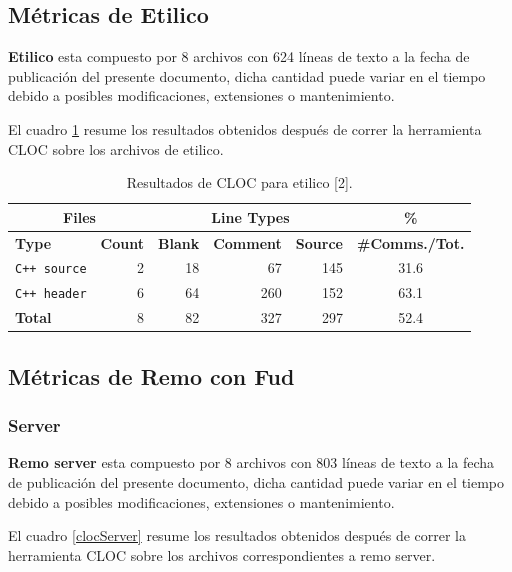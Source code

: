 \subsection{Métricas de Etilico}
\par \textbf{Etilico} esta compuesto por 8 archivos con 624 líneas de texto a la fecha de publicación del presente documento, dicha cantidad puede variar en el tiempo debido a posibles modificaciones, extensiones o mantenimiento.

\par El cuadro \ref{clocEtilico} resume los resultados obtenidos después de correr la herramienta CLOC sobre los archivos de etilico.

\begin{table}[!htf]
    \begin{center}
    \begin{tabular}{|l|r|r|r|r|c|}
    \hline
    \multicolumn{2}{|c|}{Files} & \multicolumn{3}{|c|}{Line Types} & \hspace{0.2cm}\% \\
    \hline
    \textbf{Type} & \textbf{Count} & \textbf{Blank} & \textbf{Comment} & \textbf{Source} & \small{\textbf{\#Comms./Tot.}}\\
    \hline
    \texttt{C++ source} & 2 & 18 & 67 & 145 & 31.6 \\
    \hline
    \texttt{C++ header} & 6 & 64 & 260 & 152 & 63.1 \\
    \hline
    \textbf{Total}      & 8 & 82 & 327 & 297 & 52.4 \\
    \hline
    \end{tabular}
    \caption{Resultados de CLOC para etilico [2].}
    \label{clocEtilico}
    \end{center}
\end{table}

\subsection{Métricas de \textbf{Remo} con Fud}
\subsubsection{Server}
\par \textbf{Remo server} esta compuesto por 8 archivos con 803 líneas de texto a la fecha de publicación del presente documento, dicha cantidad puede variar en el tiempo debido a posibles modificaciones, extensiones o mantenimiento.

\par El cuadro \ref{clocServer} resume los resultados obtenidos después de correr la herramienta CLOC sobre los archivos correspondientes a remo server.

